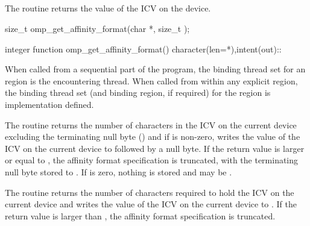 \subsection{}
\label{subsec:omp_get_affinity_format}

\summary
The  routine returns the value of the
 ICV on the device.

\format
\begin{ccppspecific}
\begin{ompcFunction}
size_t omp_get_affinity_format(char *, size_t );
\end{ompcFunction}
\end{ccppspecific}

\begin{fortranspecific}
\begin{ompfFunction}
integer function omp_get_affinity_format()
character(len=*),intent(out)::
\end{ompfFunction}
\end{fortranspecific}

\binding
When called from a sequential part of the program, the binding thread set for an
 region is the encountering thread. When called
from within any explicit  region, the binding thread set (and binding region, if
required) for the  region is implementation defined.

\effect
\begin{ccppspecific}
The  routine returns the number of characters
in the  ICV on the current device excluding the terminating
null byte () and if  is non-zero, writes the value of the
 ICV on the current device to  followed
by a null byte.  If the return value is larger or equal to ,
the affinity format specification is truncated, with the terminating
null byte stored to {}.  If  is
zero, nothing is stored and  may be .
\end{ccppspecific}

\begin{fortranspecific}
The  routine returns the number of characters required
to hold the  ICV on the current device and writes the value of the
 ICV on the current device to .
If the return value is larger than {}, the affinity
format specification is truncated.
\end{fortranspecific}

